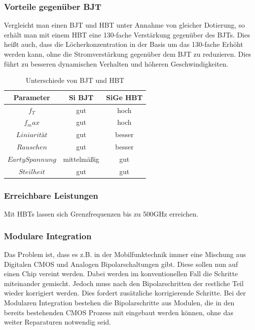 	\subsubsection{Vorteile gegenüber BJT}
	Vergleicht man einen BJT und HBT unter Annahme von gleicher Dotierung, so erhält man mit einem HBT eine 130-fache Verstärkung gegenüber des BJTs. Dies heißt auch, dass die Löcherkonzentration in der Basis um das 130-fache Erhöht werden kann, ohne die Stromverstärkung gegenüber dem BJT zu reduzieren. Dies führt zu besseren dynamischen Verhalten und höheren Geschwindigkeiten.
	
	\begin{table}
		\centering
		\begin{tabular}{c|c|c}
			Parameter & Si BJT & SiGe HBT\\
			\hline
			$f_T$ & gut & hoch \\
			$f_max$ & gut & hoch \\
			$Liniarität$ & gut & besser \\
			$Rauschen$ & gut & besser \\
			$Earty Spannung$ & mittelmäßig & gut \\
			$Steilheit$ & gut & gut \\
		\end{tabular}
		\caption{Unterschiede von BJT und HBT}
	\end{table}
	
	\subsubsection{Erreichbare Leistungen}
	Mit HBTs lassen sich Grenzfrequenzen bis zu 500GHz erreichen.
	\subsubsection{Modulare Integration}
	Das Problem ist, dass es z.B. in der Mobilfunktechnik immer eine Mischung aus Digitalen CMOS und Analogen Bipolarschaltungen gibt. Diese sollen nun auf einen Chip vereint werden. Dabei werden im konventionellen Fall die Schritte miteinander gemischt. Jedoch muss nach den Bipolarschritten der restliche Teil wieder korrigiert werden. Dies fordert zusätzliche korrigierende Schritte. Bei der Modularen Integration bestehen die Bipolarschritte aus Modulen, die in den bereits bestehenden CMOS Prozess mit eingebaut werden können, ohne das weiter Reparaturen notwendig seid. 